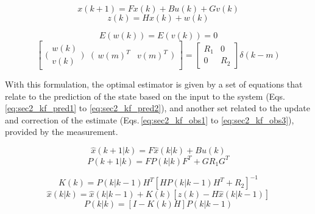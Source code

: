 \documentclass[10pt,twocolumn]{IEEEtran}
\begin{document}
\begin{equation}
    \label{eq:sec2_kf_pred}
    x(k+1) = F x(k) + B u(k) + G v(k)
\end{equation}
\begin{equation}
    \label{eq:sec2_kf_meas}
    z(k) = H x(k) + w(k)
\end{equation}

\begin{equation}
    \label{eq:sec2_noises}
    E(w(k)) = E(v(k)) = 0
\end{equation}
\begin{equation}
    \label{eq:sec2_noises_cov}
    \begin{bmatrix}
        \bigl(\begin{smallmatrix}
        w(k)\\ 
        v(k)
        \end{smallmatrix}\bigr) &\bigl(\begin{smallmatrix}
        w(m)^T & v(m)^T
        \end{smallmatrix}\bigr) 
        \end{bmatrix}
        =
        \begin{bmatrix}
        R_1 &0 \\ 
         0 & R_2 
        \end{bmatrix}
        \delta(k-m)
\end{equation}

With this formulation, the optimal estimator is given by a set of equations that relate to the prediction of the state based on the input to the system (Eqs.\,\eqref{eq:sec2_kf_pred1} to \eqref{eq:sec2_kf_pred2}), and another set related to the update and correction of the estimate (Eqs.\,\eqref{eq:sec2_kf_obs1} to \eqref{eq:sec2_kf_obs3}), provided by the measurement. 

\begin{equation}
    \label{eq:sec2_kf_pred1}
    \hat{x}(k+1 | k) = F \hat{x}(k | k) + B u(k)
\end{equation}
\begin{equation}
    \label{eq:sec2_kf_pred2}
    P(k+1|k) = F P(k|k) F^T + G R_1 G^T
\end{equation}

\begin{equation}
    \label{eq:sec2_kf_obs1}
     K(k) = P(k|k-1) H^T \left[  H P(k|k-1) H^T + R_2 \right]^{-1}
\end{equation}
\begin{equation}
    \label{eq:sec2_kf_obs2}
    \hat{x}(k | k) = \hat{x}(k | k-1) + K(k) \left [ z(k) - H \hat{x}(k | k-1) \right ]
\end{equation}
\begin{equation}
    \label{eq:sec2_kf_obs3}
    P(k|k) = \left[ I - K(k) H \right] P(k|k-1)
\end{equation}
\end{document}
